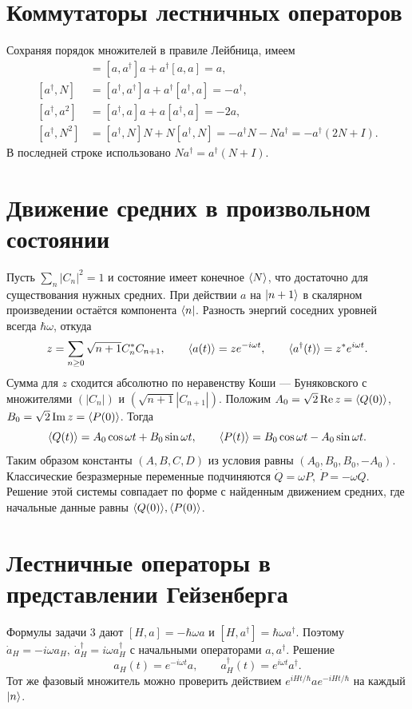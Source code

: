 \documentclass[11pt,a4paper]{article}
\begin{document}
\section{Коммутаторы лестничных операторов}

Сохраняя порядок множителей в правиле Лейбница, имеем
\begin{align*}
 [a,N]&=[a,a^\dagger]a+a^\dagger[a,a]=a,\\
 [a^\dagger,N]&=[a^\dagger,a^\dagger]a+a^\dagger[a^\dagger,a]=-a^\dagger,\\
 [a^\dagger,a^2]&=[a^\dagger,a]a+a[a^\dagger,a]=-2a,\\
 [a^\dagger,N^2]&=[a^\dagger,N]N+N[a^\dagger,N]
                 =-a^\dagger N-Na^\dagger=-a^\dagger(2N+I).
\end{align*}
В последней строке использовано \(Na^\dagger=a^\dagger(N+I)\).

\section{Движение средних в произвольном состоянии}

Пусть \(\sum_n |C_n|^2=1\) и состояние имеет конечное
\(\langle N\rangle\), что достаточно для существования нужных средних.
При действии \(a\) на \(\lvert n+1\rangle\) в скалярном
произведении остаётся компонента \(\langle n\rvert\).
Разность энергий соседних уровней всегда \(\hbar\omega\), откуда
\[
 z=\sum_{n\ge0}\sqrt{n+1}C_n^*C_{n+1},\qquad
 \langle a(t)\rangle=z e^{-i\omega t},\qquad
 \langle a^\dagger(t)\rangle=z^* e^{i\omega t}.
\]
Сумма для \(z\) сходится абсолютно по неравенству Коши --- Буняковского
с множителями \((|C_n|)\) и \((\sqrt{n+1}|C_{n+1}|)\).
Положим \(A_0=\sqrt2\operatorname{Re}z=\langle Q(0)\rangle\),
\(B_0=\sqrt2\operatorname{Im}z=\langle P(0)\rangle\). Тогда
\[
 \langle Q(t)\rangle=A_0\cos\omega t+B_0\sin\omega t,\qquad
 \langle P(t)\rangle=B_0\cos\omega t-A_0\sin\omega t .
\]
Таким образом константы \((A,B,C,D)\) из условия равны
\((A_0,B_0,B_0,-A_0)\).
Классические безразмерные переменные подчиняются
\(\dot Q=\omega P,\ \dot P=-\omega Q\).
Решение этой системы совпадает по форме с найденным движением
средних, где начальные данные равны \(\langle Q(0)\rangle,\langle P(0)\rangle\).

\section{Лестничные операторы в представлении Гейзенберга}

Формулы задачи 3 дают \([H,a]=-\hbar\omega a\) и
\([H,a^\dagger]=\hbar\omega a^\dagger\).
Поэтому \(\dot a_H=-i\omega a_H,\ \dot a^\dagger_H=i\omega a^\dagger_H\)
с начальными операторами \(a,a^\dagger\). Решение
\[
 a_H(t)=e^{-i\omega t}a,\qquad
 a_H^\dagger(t)=e^{i\omega t}a^\dagger .
\]
Тот же фазовый множитель можно проверить действием
\(e^{iHt/\hbar}a e^{-iHt/\hbar}\) на каждый \(\lvert n\rangle\).
\end{document}
